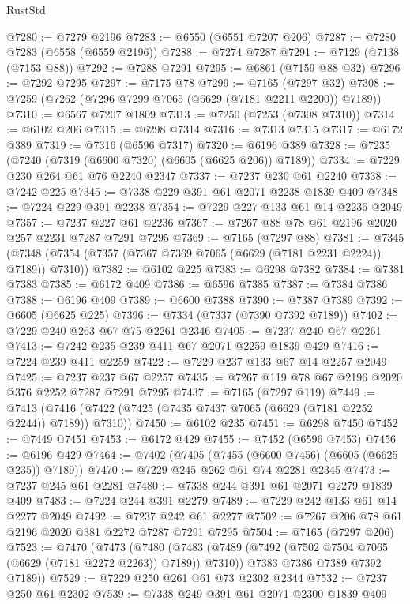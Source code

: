 \begin{lexlean}{RustStd}
\begin{coremodule}
@7280 := @7279 @2196
@7283 := @6550 (@6551 @7207 @206)
@7287 := @7280 @7283 (@6558 (@6559 @2196))
@7288 := @7274 @7287
@7291 := @7129 (@7138 (@7153 @88))
@7292 := @7288 @7291
@7295 := @6861 (@7159 @88 @32)
@7296 := @7292 @7295
@7297 := @7175 @78
@7299 := @7165 (@7297 @32)
@7308 := @7259 (@7262 (@7296 @7299 @7065 (@6629 (@7181 @2211 @2200)) @7189))
@7310 := @6567 @7207 @1809
@7313 := @7250 (@7253 (@7308 @7310))
@7314 := @6102 @206
@7315 := @6298 @7314
@7316 := @7313 @7315
@7317 := @6172 @389
@7319 := @7316 (@6596 @7317)
@7320 := @6196 @389
@7328 := @7235 (@7240 (@7319 (@6600 @7320) (@6605 (@6625 @206)) @7189))
@7334 := @7229 @230 @264 @61 @76 @2240 @2347
@7337 := @7237 @230 @61 @2240
@7338 := @7242 @225
@7345 := @7338 @229 @391 @61 @2071 @2238 @1839 @409
@7348 := @7224 @229 @391 @2238
@7354 := @7229 @227 @133 @61 @14 @2236 @2049
@7357 := @7237 @227 @61 @2236
@7367 := @7267 @88 @78 @61 @2196 @2020 @257 @2231 @7287 @7291 @7295
@7369 := @7165 (@7297 @88)
@7381 := @7345 (@7348 (@7354 (@7357 (@7367 @7369 @7065 (@6629 (@7181 @2231 @2224)) @7189)) @7310))
@7382 := @6102 @225
@7383 := @6298 @7382
@7384 := @7381 @7383
@7385 := @6172 @409
@7386 := @6596 @7385
@7387 := @7384 @7386
@7388 := @6196 @409
@7389 := @6600 @7388
@7390 := @7387 @7389
@7392 := @6605 (@6625 @225)
@7396 := @7334 (@7337 (@7390 @7392 @7189))
@7402 := @7229 @240 @263 @67 @75 @2261 @2346
@7405 := @7237 @240 @67 @2261
@7413 := @7242 @235 @239 @411 @67 @2071 @2259 @1839 @429
@7416 := @7224 @239 @411 @2259
@7422 := @7229 @237 @133 @67 @14 @2257 @2049
@7425 := @7237 @237 @67 @2257
@7435 := @7267 @119 @78 @67 @2196 @2020 @376 @2252 @7287 @7291 @7295
@7437 := @7165 (@7297 @119)
@7449 := @7413 (@7416 (@7422 (@7425 (@7435 @7437 @7065 (@6629 (@7181 @2252 @2244)) @7189)) @7310))
@7450 := @6102 @235
@7451 := @6298 @7450
@7452 := @7449 @7451
@7453 := @6172 @429
@7455 := @7452 (@6596 @7453)
@7456 := @6196 @429
@7464 := @7402 (@7405 (@7455 (@6600 @7456) (@6605 (@6625 @235)) @7189))
@7470 := @7229 @245 @262 @61 @74 @2281 @2345
@7473 := @7237 @245 @61 @2281
@7480 := @7338 @244 @391 @61 @2071 @2279 @1839 @409
@7483 := @7224 @244 @391 @2279
@7489 := @7229 @242 @133 @61 @14 @2277 @2049
@7492 := @7237 @242 @61 @2277
@7502 := @7267 @206 @78 @61 @2196 @2020 @381 @2272 @7287 @7291 @7295
@7504 := @7165 (@7297 @206)
@7523 := @7470
    (@7473
      (@7480
        (@7483 (@7489 (@7492 (@7502 @7504 @7065 (@6629 (@7181 @2272 @2263)) @7189)) @7310))
        @7383
        @7386
        @7389
        @7392
        @7189))
@7529 := @7229 @250 @261 @61 @73 @2302 @2344
@7532 := @7237 @250 @61 @2302
@7539 := @7338 @249 @391 @61 @2071 @2300 @1839 @409

\end{coremodule}
\end{lexlean}

